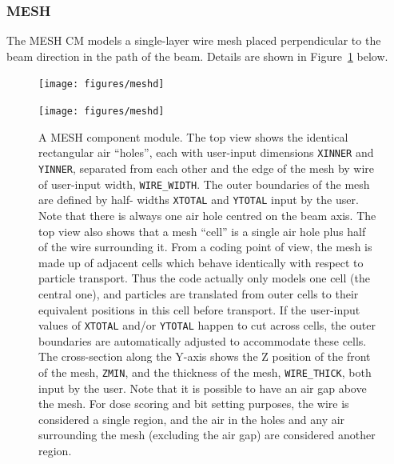 \documentclass[12pt,twoside]{article}
\begin{document}
\clearpage

\vspace*{-2cm}
\renewcommand{\rightmark}{MESH CM}
\subsubsection{MESH}
The MESH CM models a single-layer wire mesh placed perpendicular
to the beam direction in the path of the beam.  Details are shown in
Figure~\ref{fig_MESHD} below.
\begin{figure}[H]
\begin{center}
\leavevmode
\begin{latexonly}
\texttt{[image: figures/meshd]}
\end{latexonly}
\begin{htmlonly}
\texttt{[image: figures/meshd]}
\end{htmlonly}
\end{center}
\vspace*{-0.5cm}
\caption[MESH CM geometry]
{A MESH component module.  The top view shows the identical rectangular
air ``holes'',
each with user-input dimensions {\tt XINNER} and {\tt YINNER}, separated
from each other and the edge of the mesh by wire of user-input width,
{\tt WIRE\_WIDTH}.  The outer boundaries of the mesh are defined by half-
widths {\tt XTOTAL} and {\tt YTOTAL} input by the user.  Note that
there is always one air hole centred on the beam axis.  The top view
also shows that a mesh ``cell'' is a single air hole plus half of
the wire surrounding it.  From a coding point of view, the mesh
is made up of adjacent cells which behave identically with respect to
particle transport.  Thus the code actually only models one cell (the
central one), and particles are translated from outer cells to their
equivalent positions in this cell before transport.  If the user-input
values of {\tt XTOTAL} and/or {\tt YTOTAL} happen to cut across cells,
the outer boundaries are automatically adjusted to accommodate these
cells.  The cross-section along the Y-axis shows the
Z position of the front of the mesh, {\tt ZMIN}, and the thickness of
the mesh, {\tt WIRE\_THICK}, both input by the user.  Note that it is
possible to have an air gap above the mesh.  For dose scoring and bit
setting purposes, the wire is considered a single region, and the air
in the holes and any air surrounding the mesh (excluding the air gap) are
considered another region.}
\label{fig_MESHD}
\end{figure}
\end{document}
